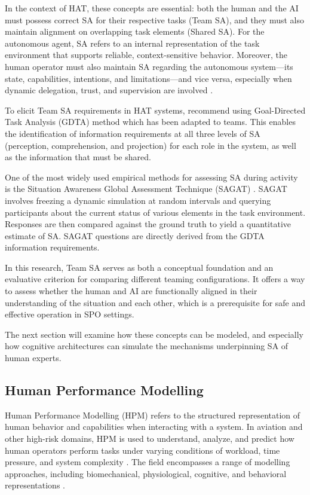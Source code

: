 \documentclass[12pt,a4paper]{article} %
\begin{document}
	In the context of HAT, these concepts are essential: both the human and the AI must possess correct SA for their respective tasks (Team SA), and they must also maintain alignment on overlapping task elements (Shared SA). For the autonomous agent, SA refers to an internal representation of the task environment that supports reliable, context-sensitive behavior. Moreover, the human operator must also maintain SA regarding the autonomous system—its state, capabilities, intentions, and limitations—and vice versa, especially when dynamic delegation, trust, and supervision are involved \parencite{endsley_designing_2003,national_academies_of_sciences_engineering_and_medicine_human-ai_2022}.

	To elicit Team SA requirements in HAT systems, \textcite{endsley_supporting_2023} recommend using Goal-Directed Task Analysis (GDTA) method which has been adapted to teams. This enables the identification of information requirements at all three levels of SA (perception, comprehension, and projection) for each role in the system, as well as the information that must be shared.

	One of the most widely used empirical methods for assessing SA during activity is the Situation Awareness Global Assessment Technique (SAGAT) \parencite{endsley_systematic_2021}. SAGAT involves freezing a dynamic simulation at random intervals and querying participants about the current status of various elements in the task environment. Responses are then compared against the ground truth to yield a quantitative estimate of SA. SAGAT questions are directly derived from the GDTA information requirements. 

	In this research, Team SA serves as both a conceptual foundation and an evaluative criterion for comparing different teaming configurations. It offers a way to assess whether the human and AI are functionally aligned in their understanding of the situation and each other, which is a prerequisite for safe and effective operation in SPO settings.

	The next section will examine how these concepts can be modeled, and especially how cognitive architectures can simulate the mechanisms underpinning SA of human experts.

	\subsection{Human Performance Modelling}

	Human Performance Modelling (HPM) refers to the structured representation of human behavior and capabilities when interacting with a system. In aviation and other high-risk domains, HPM is used to understand, analyze, and predict how human operators perform tasks under varying conditions of workload, time pressure, and system complexity \parencite{paul_modelling_2021}. The field encompasses a range of modelling approaches, including biomechanical, physiological, cognitive, and behavioral representations \parencite{alexander_ergonomic_2014,chander_modelling_2019,park_review_2024}.
\end{document}
